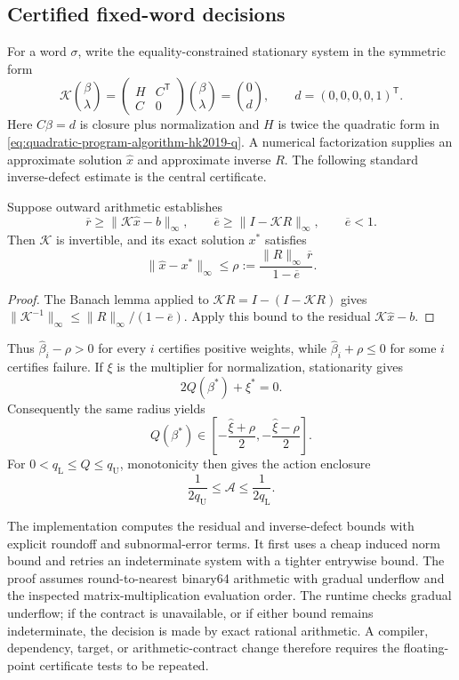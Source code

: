 \subsection{Certified fixed-word decisions}

For a word \(\sigma\), write the equality-constrained stationary system in the
symmetric form
\[
  \mathcal K
  \binom{\beta}{\lambda}
  =
  \begin{pmatrix}H&C^{\mathsf T}\\ C&0\end{pmatrix}
  \binom{\beta}{\lambda}
  =
  \binom{0}{d},
  \qquad d=(0,0,0,0,1)^{\mathsf T}.
\]
Here \(C\beta=d\) is closure plus normalization and \(H\) is twice the
quadratic form in \eqref{eq:quadratic-program-algorithm-hk2019-q}.  A numerical
factorization supplies an approximate solution \(\widehat x\) and approximate
inverse \(R\).  The following standard inverse-defect estimate is the central
certificate.

\begin{lemma}\label{lem:numerics-verified-inverse-defect}
Suppose outward arithmetic establishes
\[
  \overline r\geq\|\mathcal K\widehat x-b\|_\infty,\qquad
  \overline e\geq\|I-\mathcal K R\|_\infty,\qquad
  \overline e<1.
\]
Then \(\mathcal K\) is invertible, and its exact solution \(x^\ast\) satisfies
\[
  \|\widehat x-x^\ast\|_\infty
  \leq
  \rho:=
  \frac{\|R\|_\infty\,\overline r}{1-\overline e}.
\]
\end{lemma}

\begin{proof}
The Banach lemma applied to
\(\mathcal K R=I-(I-\mathcal K R)\) gives
\(\|\mathcal K^{-1}\|_\infty\leq
\|R\|_\infty/(1-\overline e)\).  Apply this bound to the residual
\(\mathcal K\widehat x-b\).
\end{proof}

Thus \(\widehat\beta_i-\rho>0\) for every \(i\) certifies positive weights,
while \(\widehat\beta_i+\rho\leq0\) for some \(i\) certifies failure.  If
\(\xi\) is the multiplier for normalization, stationarity gives
\[
  2Q(\beta^\ast)+\xi^\ast=0.
\]
Consequently the same radius yields
\[
  Q(\beta^\ast)\in
  \left[-\frac{\widehat\xi+\rho}{2},
        -\frac{\widehat\xi-\rho}{2}\right].
\]
For \(0<q_{\mathrm L}\leq Q\leq q_{\mathrm U}\), monotonicity then gives the
action enclosure
\[
  \frac{1}{2q_{\mathrm U}}
  \leq\mathcal A\leq
  \frac{1}{2q_{\mathrm L}}.
\]

The implementation computes the residual and inverse-defect bounds with
explicit roundoff and subnormal-error terms.  It first uses a cheap induced
norm bound and retries an indeterminate system with a tighter entrywise
bound.  The proof assumes round-to-nearest binary64 arithmetic with gradual
underflow and the inspected matrix-multiplication evaluation order.  The
runtime checks gradual underflow; if the contract is unavailable, or if either
bound remains indeterminate, the decision is made by exact rational
arithmetic.  A compiler, dependency, target, or arithmetic-contract change
therefore requires the floating-point certificate tests to be repeated.

